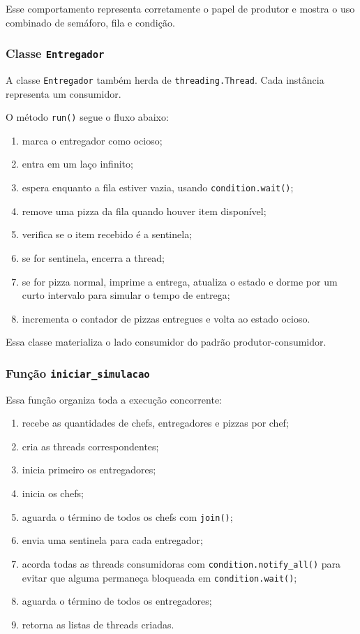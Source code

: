 \documentclass[12pt,a4paper]{article}
\begin{document}
Esse comportamento representa corretamente o papel de produtor e mostra o uso combinado de sem\'aforo, fila e condi\c{c}\~ao.

\subsubsection{Classe \texttt{Entregador}}
A classe \texttt{Entregador} tamb\'em herda de \texttt{threading.Thread}. Cada inst\^ancia representa um consumidor.

O m\'etodo \texttt{run()} segue o fluxo abaixo:
\begin{enumerate}
    \item marca o entregador como ocioso;
    \item entra em um la\c{c}o infinito;
    \item espera enquanto a fila estiver vazia, usando \texttt{condition.wait()};
    \item remove uma pizza da fila quando houver item dispon\'ivel;
    \item verifica se o item recebido \'e a sentinela;
    \item se for sentinela, encerra a thread;
    \item se for pizza normal, imprime a entrega, atualiza o estado e dorme por um curto intervalo para simular o tempo de entrega;
    \item incrementa o contador de pizzas entregues e volta ao estado ocioso.
\end{enumerate}

Essa classe materializa o lado consumidor do padr\~ao produtor-consumidor.

\subsubsection{Fun\c{c}\~ao \texttt{iniciar\_simulacao}}
Essa fun\c{c}\~ao organiza toda a execu\c{c}\~ao concorrente:
\begin{enumerate}
    \item recebe as quantidades de chefs, entregadores e pizzas por chef;
    \item cria as threads correspondentes;
    \item inicia primeiro os entregadores;
    \item inicia os chefs;
    \item aguarda o t\'ermino de todos os chefs com \texttt{join()};
    \item envia uma sentinela para cada entregador;
    \item acorda todas as threads consumidoras com \texttt{condition.notify\_all()} para evitar que alguma permane\c{c}a bloqueada em \texttt{condition.wait()};
    \item aguarda o t\'ermino de todos os entregadores;
    \item retorna as listas de threads criadas.
\end{enumerate}
\end{document}
